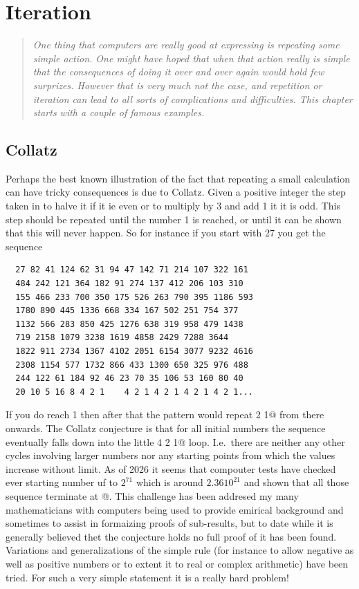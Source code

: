 \section{Iteration}
\begin{quotation}\textit{One thing that computers are really good at
expressing is repeating some simple action. One might have hoped that
when that action really is simple that the consequences of doing it over
and over again would hold few surprizes. However that is very much not the
case, and repetition or iteration can lead to all sorts of complications
and difficulties. This chapter starts with a couple of famous examples.
}\end{quotation}
\subsection{Collatz}
Perhaps the best known illustration of the fact that repeating a small
calculation can have tricky consequences is due to Collatz\cite{collats}.
Given a positive integer the step taken in to halve it if it ie even or
to multiply by 3 and add 1 it it is odd. This step should be repeated
until the number 1 is reached, or until it can be shown that this
will never happen. So for instance if you start with 27 you get the
sequence
\begin{verbatim}
  27 82 41 124 62 31 94 47 142 71 214 107 322 161
  484 242 121 364 182 91 274 137 412 206 103 310
  155 466 233 700 350 175 526 263 790 395 1186 593
  1780 890 445 1336 668 334 167 502 251 754 377
  1132 566 283 850 425 1276 638 319 958 479 1438
  719 2158 1079 3238 1619 4858 2429 7288 3644
  1822 911 2734 1367 4102 2051 6154 3077 9232 4616
  2308 1154 577 1732 866 433 1300 650 325 976 488
  244 122 61 184 92 46 23 70 35 106 53 160 80 40
  20 10 5 16 8 4 2 1    4 2 1 4 2 1 4 2 1 4 2 1...
\end{verbatim}
If you do reach 1 then after that the pattern would repeat
 2 1@ from there onwards. The Collatz conjecture is that
for all initial numbers the sequence eventually falls down into
the little  4 2 1@ loop. I.e.\ there are neither any other
cycles involving larger numbers nor any starting points from which
the values increase without limit. As of 2026 it seems that
compouter tests have checked ever starting number uf to $2^71$ which
is around $2.36 10^{21}$ and shown that all those sequence terminate
at @. This challenge has been addresed my many mathematicians
with computers being used to provide emirical background and sometimes
to assist in formaizing proofs of sub-results, but to date while
it is generally believed thet the conjecture holds no full proof
of it has been found. Variations and generalizations of the simple
rule (for instance to allow negative as well as positive numbers or
to extent it to real or complex arithmetic) have been tried. For
such a very simple statement it is a really hard problem! 
